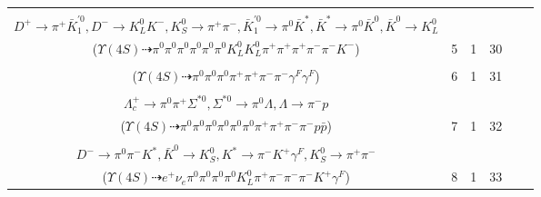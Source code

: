 \documentclass[landscape]{article}
\newcounter{rownumbers}
\newcommand\rn{\stepcounter{rownumbers}\arabic{rownumbers}}
\newcommand{\EOLP}{\\ \hline} %
\newcommand{\topoTags}[1]{#1} %
\begin{document}
\begin{longtable}{clcccc}
\rn & \makecell[l]{ $ 
\Upsilon(4S) \rightarrow B^{0} \bar{B}^{0} ,
B^{0} \rightarrow \pi^{0} \bar{D}^{0} ,
\bar{B}^{0} \rightarrow \pi^{0} \rho^{0} \bar{K}^{0} D^{+} D^{-} ,
\bar{D}^{0} \rightarrow \pi^{0} \pi^{0} ,
\rho^{0} \rightarrow \pi^{+} \pi^{-} ,
\bar{K}^{0} \rightarrow K_{S}^{0} ,
$ \\ $
D^{+} \rightarrow \pi^{+} \bar{K}_1^{'0} ,
D^{-} \rightarrow K_{L}^{0} K^{-} ,
K_{S}^{0} \rightarrow \pi^{+} \pi^{-} ,
\bar{K}_1^{'0} \rightarrow \pi^{0} \bar{K}^{*} ,
\bar{K}^{*} \rightarrow \pi^{0} \bar{K}^{0} ,
\bar{K}^{0} \rightarrow K_{L}^{0} 
$ \\ ($
\Upsilon(4S) \dashrightarrow \pi^{0} \pi^{0} \pi^{0} \pi^{0} \pi^{0} \pi^{0} K_{L}^{0} K_{L}^{0} \pi^{+} \pi^{+} \pi^{+} \pi^{-} \pi^{-} K^{-} 
$) } & \topoTags{5 & }1 & 30 \EOLP

\rn & \makecell[l]{ $ 
\Upsilon(4S) \rightarrow \bar{B}^{0} \bar{B}^{0} ,
\bar{B}^{0} \rightarrow \pi^{0} D^{0} ,
\bar{B}^{0} \rightarrow \pi^{+} \pi^{-} \bar{K}^{0} \gamma^{F} \gamma^{F} ,
D^{0} \rightarrow \pi^{0} \pi^{0} ,
\bar{K}^{0} \rightarrow K_{S}^{0} ,
K_{S}^{0} \rightarrow \pi^{+} \pi^{-} 
$ \\ ($
\Upsilon(4S) \dashrightarrow \pi^{0} \pi^{0} \pi^{0} \pi^{+} \pi^{+} \pi^{-} \pi^{-} \gamma^{F} \gamma^{F} 
$) } & \topoTags{6 & }1 & 31 \EOLP

\rn & \makecell[l]{ $ 
\Upsilon(4S) \rightarrow B^{0} \bar{B}^{0} ,
B^{0} \rightarrow \pi^{0} \bar{D}^{0} ,
\bar{B}^{0} \rightarrow \pi^{-} \bar{\Delta}^{0} \Sigma_{c}^{+} ,
\bar{D}^{0} \rightarrow \pi^{0} \pi^{0} ,
\bar{\Delta}^{0} \rightarrow \pi^{+} \bar{p} ,
\Sigma_{c}^{+} \rightarrow \pi^{0} \Lambda_{c}^{+} ,
$ \\ $
\Lambda_{c}^{+} \rightarrow \pi^{0} \pi^{+} \Sigma^{*0} ,
\Sigma^{*0} \rightarrow \pi^{0} \Lambda ,
\Lambda \rightarrow \pi^{-} p 
$ \\ ($
\Upsilon(4S) \dashrightarrow \pi^{0} \pi^{0} \pi^{0} \pi^{0} \pi^{0} \pi^{0} \pi^{+} \pi^{+} \pi^{-} \pi^{-} p \bar{p} 
$) } & \topoTags{7 & }1 & 32 \EOLP

\rn & \makecell[l]{ $ 
\Upsilon(4S) \rightarrow B^{0} B^{0} ,
B^{0} \rightarrow \pi^{0} \bar{D}^{0} ,
B^{0} \rightarrow K^{0} D^{+} D^{-} ,
\bar{D}^{0} \rightarrow \pi^{0} \pi^{0} ,
K^{0} \rightarrow K_{L}^{0} ,
D^{+} \rightarrow e^{+} \nu_{e} \bar{K}^{0} ,
$ \\ $
D^{-} \rightarrow \pi^{0} \pi^{-} K^{*} ,
\bar{K}^{0} \rightarrow K_{S}^{0} ,
K^{*} \rightarrow \pi^{-} K^{+} \gamma^{F} ,
K_{S}^{0} \rightarrow \pi^{+} \pi^{-} 
$ \\ ($
\Upsilon(4S) \dashrightarrow e^{+} \nu_{e} \pi^{0} \pi^{0} \pi^{0} \pi^{0} K_{L}^{0} \pi^{+} \pi^{-} \pi^{-} \pi^{-} K^{+} \gamma^{F} 
$) } & \topoTags{8 & }1 & 33 \EOLP


\end{longtable}
\end{document}
